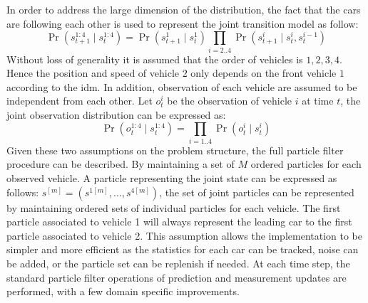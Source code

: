 	In order to address the large dimension of the distribution, the fact that the cars are following each other is used to represent the joint transition model as follow:
	\begin{equation}
		\Pr(s_{t+1}^{1:4} \mid s_{t}^{1:4}) = \Pr(s_{t+1}^{1}\mid s_t^1)\prod_{i=2..4}\Pr(s_{t+1}^{i}\mid s_t^i, s_t^{i-1})
		\label{eq:transition}
	\end{equation}
	Without loss of generality it is assumed that the order of vehicles is $1, 2, 3, 4$. Hence the position and speed of vehicle $2$ only depends on the front vehicle $1$ according to the \gls{idm}. In addition, observation of each vehicle are assumed to be independent from each other. 
	Let $o^i_t$ be the observation of vehicle $i$ at time $t$, the joint observation distribution can be expressed as:
	\begin{equation}
		\Pr(o^{1:4}_t \mid s_t^{1:4}) = \prod_{i=1..4}\Pr(o^i_t \mid  s_t^i)
		\label{eq:observation}
	\end{equation}
	Given these two assumptions on the problem structure, the full particle filter procedure can be described. By maintaining a set of $M$ ordered particles for each observed vehicle. A particle representing the joint state can be expressed as follows: $s^{[m]} = (s^{1[m]}, \ldots, s^{4[m]})$, the set of joint particles can be represented by maintaining ordered sets of individual particles for each vehicle. The first particle associated to vehicle 1 will always represent the leading car to the first particle associated to vehicle 2. This assumption allows the implementation to be simpler and more efficient as the statistics for each car can be tracked, noise can be added, or the particle set can be replenish if needed.
	At each time step, the standard particle filter operations of prediction and measurement updates are performed, with a few domain specific improvements.  

